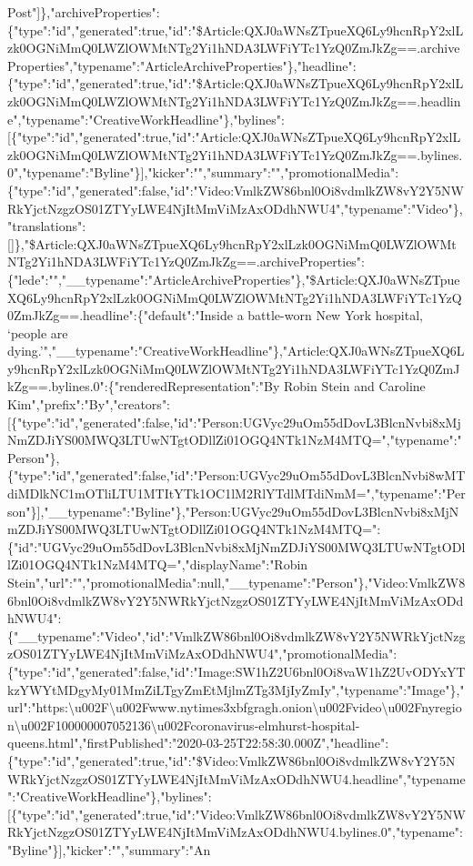 Post"{]}\},"archiveProperties":\{"type":"id","generated":true,"id":"\$Article:QXJ0aWNsZTpueXQ6Ly9hcnRpY2xlLzk0OGNiMmQ0LWZlOWMtNTg2Yi1hNDA3LWFiYTc1YzQ0ZmJkZg==.archiveProperties","typename":"ArticleArchiveProperties"\},"headline":\{"type":"id","generated":true,"id":"\$Article:QXJ0aWNsZTpueXQ6Ly9hcnRpY2xlLzk0OGNiMmQ0LWZlOWMtNTg2Yi1hNDA3LWFiYTc1YzQ0ZmJkZg==.headline","typename":"CreativeWorkHeadline"\},"bylines":{[}\{"type":"id","generated":true,"id":"Article:QXJ0aWNsZTpueXQ6Ly9hcnRpY2xlLzk0OGNiMmQ0LWZlOWMtNTg2Yi1hNDA3LWFiYTc1YzQ0ZmJkZg==.bylines.0","typename":"Byline"\}{]},"kicker":"","summary":"","promotionalMedia":\{"type":"id","generated":false,"id":"Video:VmlkZW86bnl0Oi8vdmlkZW8vY2Y5NWRkYjctNzgzOS01ZTYyLWE4NjItMmViMzAxODdhNWU4","typename":"Video"\},"translations":{[}{]}\},"\$Article:QXJ0aWNsZTpueXQ6Ly9hcnRpY2xlLzk0OGNiMmQ0LWZlOWMtNTg2Yi1hNDA3LWFiYTc1YzQ0ZmJkZg==.archiveProperties":\{"lede":"","\_\_typename":"ArticleArchiveProperties"\},"\$Article:QXJ0aWNsZTpueXQ6Ly9hcnRpY2xlLzk0OGNiMmQ0LWZlOWMtNTg2Yi1hNDA3LWFiYTc1YzQ0ZmJkZg==.headline":\{"default":"Inside
a battle-worn New York hospital, `people are
dying.'","\_\_typename":"CreativeWorkHeadline"\},"Article:QXJ0aWNsZTpueXQ6Ly9hcnRpY2xlLzk0OGNiMmQ0LWZlOWMtNTg2Yi1hNDA3LWFiYTc1YzQ0ZmJkZg==.bylines.0":\{"renderedRepresentation":"By
Robin Stein and Caroline
Kim","prefix":"By","creators":{[}\{"type":"id","generated":false,"id":"Person:UGVyc29uOm55dDovL3BlcnNvbi8xMjNmZDJiYS00MWQ3LTUwNTgtODllZi01OGQ4NTk1NzM4MTQ=","typename":"Person"\},\{"type":"id","generated":false,"id":"Person:UGVyc29uOm55dDovL3BlcnNvbi8wMTdiMDlkNC1mOTliLTU1MTItYTk1OC1lM2RlYTdlMTdiNmM=","typename":"Person"\}{]},"\_\_typename":"Byline"\},"Person:UGVyc29uOm55dDovL3BlcnNvbi8xMjNmZDJiYS00MWQ3LTUwNTgtODllZi01OGQ4NTk1NzM4MTQ=":\{"id":"UGVyc29uOm55dDovL3BlcnNvbi8xMjNmZDJiYS00MWQ3LTUwNTgtODllZi01OGQ4NTk1NzM4MTQ=","displayName":"Robin
Stein","url":"","promotionalMedia":null,"\_\_typename":"Person"\},"Video:VmlkZW86bnl0Oi8vdmlkZW8vY2Y5NWRkYjctNzgzOS01ZTYyLWE4NjItMmViMzAxODdhNWU4":\{"\_\_typename":"Video","id":"VmlkZW86bnl0Oi8vdmlkZW8vY2Y5NWRkYjctNzgzOS01ZTYyLWE4NjItMmViMzAxODdhNWU4","promotionalMedia":\{"type":"id","generated":false,"id":"Image:SW1hZ2U6bnl0Oi8vaW1hZ2UvODYxYTkzYWYtMDgyMy01MmZiLTgyZmEtMjlmZTg3MjIyZmIy","typename":"Image"\},"url":"https:\textbackslash{}u002F\textbackslash{}u002Fwww.nytimes3xbfgragh.onion\textbackslash{}u002Fvideo\textbackslash{}u002Fnyregion\textbackslash{}u002F100000007052136\textbackslash{}u002Fcoronavirus-elmhurst-hospital-queens.html","firstPublished":"2020-03-25T22:58:30.000Z","headline":\{"type":"id","generated":true,"id":"\$Video:VmlkZW86bnl0Oi8vdmlkZW8vY2Y5NWRkYjctNzgzOS01ZTYyLWE4NjItMmViMzAxODdhNWU4.headline","typename":"CreativeWorkHeadline"\},"bylines":{[}\{"type":"id","generated":true,"id":"Video:VmlkZW86bnl0Oi8vdmlkZW8vY2Y5NWRkYjctNzgzOS01ZTYyLWE4NjItMmViMzAxODdhNWU4.bylines.0","typename":"Byline"\}{]},"kicker":"","summary":"An
